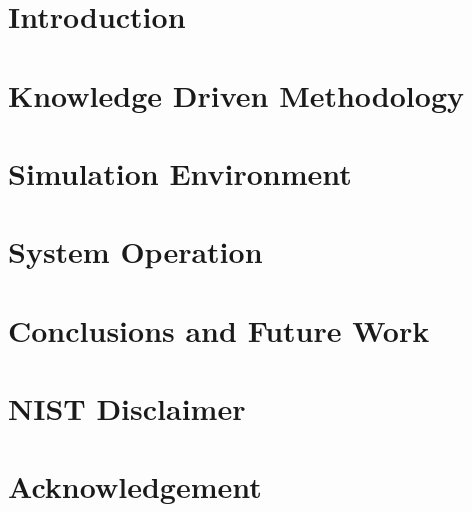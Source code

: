 \documentclass{llncs}
\begin{document}
%
%

\section{Introduction}

\section{Knowledge Driven Methodology}\label{section:architecture}


\section{Simulation Environment}\label{section:simulation}


%
\section{System Operation}\label{section:sensor}


\section{Conclusions and Future Work}\label{section:conclusions}


\section{NIST Disclaimer}


\section{Acknowledgement}

%
%


\clearpage
{} %
\renewcommand{\indexname}{Author Index}
\printindex
\clearpage
{} %
\renewcommand{\indexname}{Subject Index}

\end{document}
